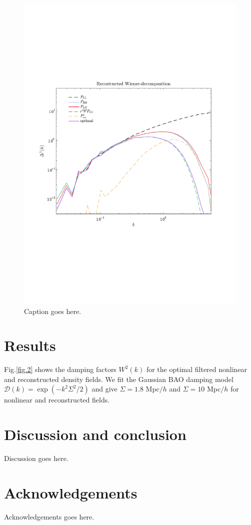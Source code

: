 \documentclass[aps,prd,twocolumn,superscriptaddress,amsfont,amssymb,amsmath,nofootinbib,showpacs,balancelastpage]{revtex4-1}
\begin{document}
\begin{figure}[t] \centering
  \includegraphics[width=1.0\linewidth]{fig4.pdf}
  \caption{Caption goes here.}
  \label{fig.4}
\end{figure}

\section{Results}\label{sec.results}
Fig.\ref{fig.2} shows the damping factors $W^2(k)$ for the optimal filtered nonlinear and reconstructed density fields. We fit the Gaussian BAO damping model ${\mathcal D}(k)=\exp(-k^2\Sigma^2/2)$ and give $\Sigma=1.8$ Mpc$/h$ and $\Sigma=10$ Mpc$/h$ for nonlinear and reconstructed fields.




\section{Discussion and conclusion}\label{sec.discussion}
Discussion goes here.

\section*{Acknowledgements}
Acknowledgements goes here.

%


\end{document}
